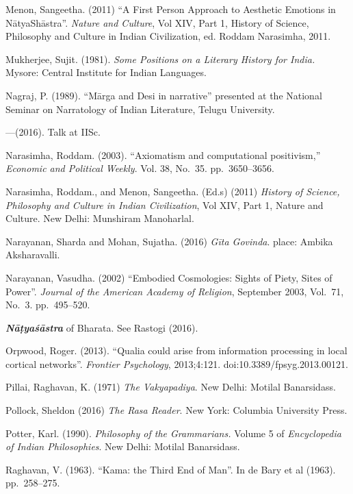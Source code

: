 \begin{thebibliography}{99}
Menon, Sangeetha. (2011) “A First Person Approach to Aesthetic Emotions in NātyaShāstra”. \textsl{Nature and Culture}, Vol XIV, Part 1, History of Science, Philosophy and Culture in Indian Civilization, ed. Roddam Narasimha, 2011.

Mukherjee, Sujit. (1981). \textsl{Some Positions on a Literary History for India.} Mysore: Central Institute for Indian Languages.

Nagraj, P. (1989). “Mārga and Desi in narrative” presented at the National Seminar on Narratology of Indian Literature, Telugu University.

---\kern3pt(2016). Talk at IISc.

Narasimha, Roddam. (2003). “Axiomatism and computational positivism,” \textsl{Economic and Political Weekly}. Vol. 38, No.~35. pp.~3650--3656.

Narasimha, Roddam., and Menon, Sangeetha. (Ed.s) (2011) \textsl{History of Science, Philosophy and Culture in Indian Civilization}, Vol XIV, Part 1, Nature and Culture. New Delhi: Munshiram Manoharlal.

Narayanan, Sharda and Mohan, Sujatha. (2016) \textsl{Gīta Govinda}. place: Ambika Aksharavalli.

Narayanan, Vasudha. (2002) “Embodied Cosmologies: Sights of Piety, Sites of Power”. \textsl{Journal of the American Academy of Religion}, September 2003, Vol.~71, No.~3. pp.~495--520.

{\sl\bfseries Nāṭyaśāstra} of Bharata. See Rastogi (2016).

Orpwood, Roger. (2013). “Qualia could arise from information processing in local cortical networks”. \textsl{Frontier Psychology}, 2013;4:121. doi:10.3389/fpsyg.2013.00121.

Pillai, Raghavan, K. (1971) \textsl{The Vakyapadiya}. New Delhi: Motilal Banarsidass.

Pollock, Sheldon (2016) \textsl{The Rasa Reader}. New York: Columbia University Press.

Potter, Karl. (1990). \textsl{Philosophy of the Grammarians.} Volume 5 of \textsl{Encyclopedia of Indian Philosophies}. New Delhi: Motilal Banarsidass.

Raghavan, V. (1963). “Kama: the Third End of Man”. In de Bary et al (1963). pp.~258--275.


\end{thebibliography}
